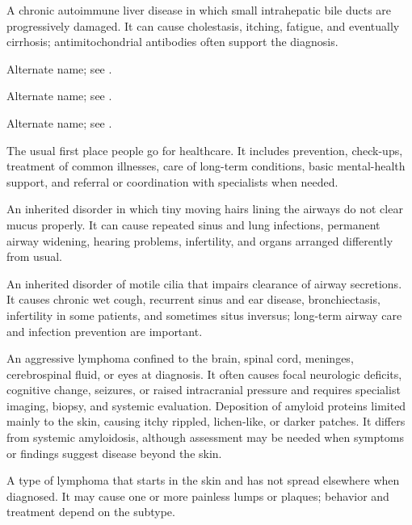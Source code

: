  A chronic autoimmune liver disease in which small intrahepatic bile ducts are
progressively damaged. It can cause cholestasis, itching, fatigue, and eventually cirrhosis; antimitochondrial antibodies
often support the diagnosis.

 Alternate name; see .

 Alternate name; see .

 Alternate name; see .

 The usual first place people go for healthcare. It includes prevention, check-ups, treatment of common illnesses, care of long-term conditions, basic mental-health support, and referral or coordination with specialists when needed.

 An inherited disorder in which tiny moving hairs lining the airways do not clear mucus properly. It can cause repeated sinus and lung infections, permanent airway widening, hearing problems, infertility, and organs arranged differently from usual.

 An inherited disorder of motile cilia that impairs clearance of airway secretions. It causes chronic wet cough, recurrent sinus and ear disease, bronchiectasis, infertility in some patients, and sometimes situs inversus; long-term airway care and infection prevention are important.

 An aggressive lymphoma confined to the brain, spinal cord, meninges, cerebrospinal fluid, or eyes at diagnosis. It often causes focal neurologic deficits, cognitive change, seizures, or raised intracranial pressure and requires specialist imaging, biopsy, and systemic evaluation.
 Deposition of amyloid proteins limited mainly to the skin, causing itchy rippled, lichen-like, or darker patches. It differs from systemic amyloidosis, although assessment may be needed when symptoms or findings suggest disease beyond the skin.

 A type of lymphoma that starts in the skin and has not spread elsewhere when diagnosed. It may cause one or more painless lumps or plaques; behavior and treatment depend on the subtype.

